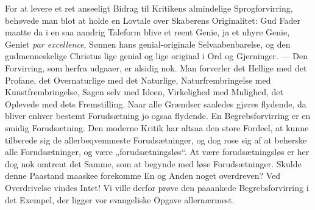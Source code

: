 \documentclass[12pt,a4paper]{book}
\begin{document}
For at levere et ret anseeligt Bidrag til Kritikens almindelige Sprogforvirring,
behøvede man blot at holde en Lovtale over Skaberens Originalitet: Gud Fader
maatte da i en saa aandrig Taleform blive et reent Genie, ja et uhyre Genie,
Geniet \textit{par excellence}, Sønnen hans genial-originale Selvaabenbarelse, og
den gudmenneskelige Christus lige genial og lige original i Ord og Gjerninger. ---
Den Forvirring, som herfra udgaaer, er alsidig nok. Man forverler det Hellige med
det Profane, det Overnaturlige med det Naturlige, Naturfrembringelse med
Kunstfrembringelse, Sagen selv med Ideen, Virkelighed med Mulighed, det Oplevede
med dets Fremstilling. Naar alle Grændser saaledes gjøres flydende, da bliver
enhver bestemt Forudsætning jo ogsaa flydende. En Begrebsforvirring er en smidig
Forudsætning. Den moderne Kritik har altsaa den store Fordeel, at kunne tilberede
sig de allerbeqvemmeste Forudsætninger, og dog rose sig af at beherske alle
Forudsætninger, og være „forudsætningsløs“. At være forudsætningsløs er her dog
nok omtrent det Samme, som at begynde med løse Forudsætninger. Skulde denne
Paastand maaskee forekomme En og Anden noget overdreven? Ved Overdrivelse vindes
Intet! Vi ville derfor prøve den paaankede Begrebsforvirring i det Exempel, der
ligger vor evangeliske Opgave allernærmest.
\end{document}
